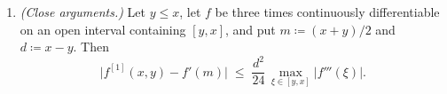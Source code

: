 \begin{lemma}
\begin{enumerate}[label=(\roman*),leftmargin=2.4em]
\begin{enumerate}[label=(\alph*),leftmargin=2.2em]
    integrable.
  \item If $Q$ is positive definite as well and $0<a\le\min\{\lmin(P),
    \lmin(Q)\}$, then
    \begin{equation}\label{eq:dd-lipschitz}
      \big\|\mathrm{D}_P[H]-\mathrm{D}_Q[H]\big\|_{\mathrm F}
      \;\le\;p(1-p)\,a^{p-2}\,\opn{P-Q}\,\|H\|_{\mathrm F}
      \;\le\;p(1-p)\,a^{p-2}\,\|P-Q\|_{\mathrm F}\,\|H\|_{\mathrm F}.
    \end{equation}
  \item For every unitary $U$,
    $\mathrm{D}_{UPU^{\dagger}}[H]=U\,\mathrm{D}_P[U^{\dagger}HU]\,U^{\dagger}$;
    and if $P=\operatorname{diag}(d_1,\dots,d_n)$, the $d_k>0$ not
    necessarily distinct, then
    $\mathrm{D}_P[H]_{kl}=f^{[1]}(d_k,d_l)\,H_{kl}$ for all $k,l$.
  \end{enumerate}
\item \emph{(Close arguments.)} Let $y\le x$, let $f$ be three times
  continuously differentiable on an open interval containing $[y,x]$, and put
  $m\coloneqq(x+y)/2$ and $d\coloneqq x-y$. Then
  \begin{equation}\label{eq:dd-close}
    \big|f^{[1]}(x,y)-f'(m)\big|\;\le\;\frac{d^{2}}{24}\,
    \max_{\xi\in[y,x]}|f'''(\xi)| .
  \end{equation}
\end{enumerate}
\end{lemma}

